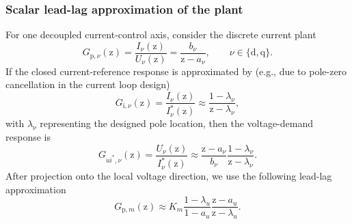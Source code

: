 \begin{frame}
    \frametitle{Scalar lead-lag approximation of the plant}
    For one decoupled current-control axis, consider the discrete current plant
    \begin{equation}
        G_{\mathrm{p},\nu}(\mathrm{z})
        =
        \frac{I_\nu(\mathrm{z})}{U_\nu(\mathrm{z})}
        =
        \frac{b_\nu}{\mathrm{z}-a_\nu},
        \qquad \nu\in\{\mathrm{d},\mathrm{q}\} .
    \end{equation}
    If the closed current-reference response is approximated by (e.g., due to pole-zero cancellation in the current loop design)
    \begin{equation}
        G_{\mathrm{i},\nu}(\mathrm{z})
        =
        \frac{I_\nu(\mathrm{z})}{I_\nu^*(\mathrm{z})}
        \approx
        \frac{1-\lambda_\nu}{\mathrm{z}-\lambda_\nu},
    \end{equation}
    with $\lambda_\nu$ representing the designed pole location, then the voltage-demand response is
    \begin{equation}
        G_{u i^*,\nu}(\mathrm{z})
        =
        \frac{U_\nu(\mathrm{z})}{I_\nu^*(\mathrm{z})}
        \approx
        \frac{\mathrm{z}-a_\nu}{b_\nu}
        \frac{1-\lambda_\nu}{\mathrm{z}-\lambda_\nu} .
    \end{equation}
    After projection onto the local voltage direction, we use the following lead-lag approximation
    \begin{equation}
        G_{\mathrm{p},m}(\mathrm{z})
        \approx
        K_{m}\frac{1-\lambda_u}{1-a_u}
        \frac{\mathrm{z}-a_u}{\mathrm{z}-\lambda_u} .
    \end{equation}
\end{frame}

